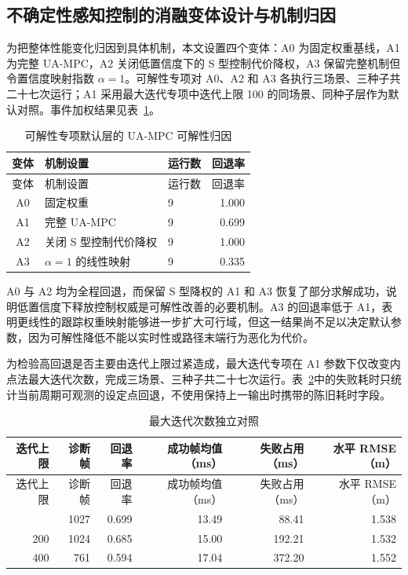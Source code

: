 \subsection{不确定性感知控制的消融变体设计与机制归因}\label{sec:ch05-5-5-8}

为把整体性能变化归因到具体机制，本文设置四个变体：A0 为固定权重基线，A1 为完整 UA-MPC，A2 关闭低置信度下的 S 型控制代价降权，A3 保留完整机制但令置信度映射指数 \(\alpha=1\)。可解性专项对 A0、A2 和 A3 各执行三场景、三种子共二十七次运行；A1 采用最大迭代专项中迭代上限 100 的同场景、同种子层作为默认对照。事件加权结果见表~\ref{tab:ch05-uampc-p1-feasibility}。

\begin{longtable}[]{@{}cllr@{}}
\caption{可解性专项默认层的 UA-MPC 可解性归因}\label{tab:ch05-uampc-p1-feasibility}\tabularnewline
\toprule\noalign{}
变体 & 机制设置 & 运行数 & 回退率 \\
\midrule\noalign{}
\endfirsthead
\toprule\noalign{}
变体 & 机制设置 & 运行数 & 回退率 \\
\midrule\noalign{}
\endhead
\bottomrule\noalign{}
\endlastfoot
A0 & 固定权重 & 9 & 1.000 \\
A1 & 完整 UA-MPC & 9 & 0.699 \\
A2 & 关闭 S 型控制代价降权 & 9 & 1.000 \\
A3 & \(\alpha=1\) 的线性映射 & 9 & 0.335 \\
\end{longtable}

A0 与 A2 均为全程回退，而保留 S 型降权的 A1 和 A3 恢复了部分求解成功，说明低置信度下释放控制权威是可解性改善的必要机制。A3 的回退率低于 A1，表明更线性的跟踪权重映射能够进一步扩大可行域，但这一结果尚不足以决定默认参数，因为可解性降低不能以实时性或路径末端行为恶化为代价。

为检验高回退是否主要由迭代上限过紧造成，最大迭代专项在 A1 参数下仅改变内点法最大迭代次数，完成三场景、三种子共二十七次运行。表~\ref{tab:ch05-uampc-p2-maxiter}中的失败耗时只统计当前周期可观测的设定点回退，不使用保持上一输出时携带的陈旧耗时字段。

\begin{longtable}[]{@{}rrrrrr@{}}
\caption{最大迭代次数独立对照}\label{tab:ch05-uampc-p2-maxiter}\tabularnewline
\toprule\noalign{}
迭代上限 & 诊断帧 & 回退率 & 成功帧均值（ms） & 失败占用（ms） & 水平 RMSE（m） \\
\midrule\noalign{}
\endfirsthead
\toprule\noalign{}
迭代上限 & 诊断帧 & 回退率 & 成功帧均值（ms） & 失败占用（ms） & 水平 RMSE（m） \\
\midrule\noalign{}
\endhead
\bottomrule\noalign{}
\endlastfoot
100 & 1027 & 0.699 & 13.49 & 88.41 & 1.538 \\
200 & 1024 & 0.685 & 15.00 & 192.21 & 1.532 \\
400 & 761 & 0.594 & 17.04 & 372.20 & 1.552 \\
\end{longtable}

